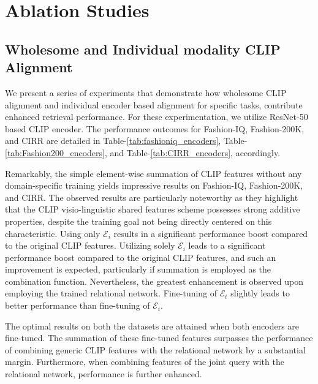 \documentclass[10pt,lineno]{wlpeerj}
\begin{document}
\section{Ablation Studies}\label{sec:Ablation_studies}
\subsection*{Wholesome and Individual modality CLIP Alignment}\label{sec:joint_encoders}
We present a series of experiments that demonstrate how wholesome CLIP alignment and individual encoder based alignment for specific tasks, contribute enhanced retrieval performance. For these experimentation, we utilize ResNet-50 based CLIP encoder. The performance outcomes for Fashion-IQ, Fashion-200K, and CIRR are detailed in Table-\ref{tab:fashioniq_encoders}, Table-\ref{tab:Fashion200_encoders}, and Table-\ref{tab:CIRR_encoders}, accordingly. 

\par Remarkably, the simple element-wise summation of CLIP features without any domain-specific training yields impressive results on Fashion-IQ, Fashion-200K, and CIRR. The observed results are particularly noteworthy as they highlight that the CLIP visio-linguistic shared features scheme possesses strong additive properties, despite the training goal not being directly centered on this characteristic. Using only $\mathcal{E}_i$ results in a significant performance boost compared to the original CLIP features. Utilizing solely $\mathcal{E}_i$ leads to a significant performance boost compared to the original CLIP features, and such an improvement is expected, particularly if summation is employed as the combination function. Nevertheless, the greatest enhancement is observed upon employing the trained relational network.
Fine-tuning of $\mathcal{E}_t$ slightly leads to better performance than fine-tuning of $\mathcal{E}_i$.
\par The optimal results on both the datasets are attained when both encoders are fine-tuned. The summation of these fine-tuned features surpasses the performance of combining generic CLIP features with the relational network by a substantial margin.
Furthermore, when combining features of the joint query with the relational network, performance is further enhanced.
\end{document}
